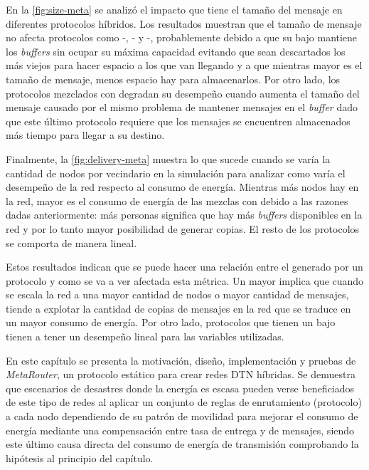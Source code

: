 En la \ref{fig:size-meta} se analizó el impacto que tiene el tamaño del
mensaje en diferentes protocolos híbridos. Los resultados muestran que el tamaño
de mensaje no afecta protocolos como \prophet-\syw, \maxprop-\syw{} y
\epidemic-\syw, probablemente debido a que su bajo \overhead{} mantiene los
\textit{buffers} sin ocupar su máxima capacidad evitando que sean descartados
los más viejos para hacer espacio a los que van llegando y a que mientras mayor
es el tamaño de mensaje, menos espacio hay para almacenarlos.  Por otro lado,
los protocolos mezclados con \syf{} degradan su desempeño cuando aumenta el
tamaño del mensaje causado por el mismo problema de mantener mensajes en el
\textit{buffer} dado que este último protocolo requiere que los mensajes se
encuentren almacenados más tiempo para llegar a su destino.

Finalmente, la \ref{fig:delivery-meta} muestra lo que sucede cuando se varía la
cantidad de nodos por vecindario en la simulación para analizar como varía el
desempeño de la red respecto al consumo de energía. Mientras más nodos hay en la
red, mayor es el consumo de energía de las mezclas con \syf{} debido a las
razones dadas anteriormente: más personas significa que hay más \textit{buffers}
disponibles en la red y por lo tanto mayor posibilidad de generar copias. El
resto de los protocolos se comporta de manera lineal.


Estos resultados indican que se puede hacer una relación entre el \overhead{}
generado por un protocolo y como se va a ver afectada esta métrica. Un mayor
\overhead{} implica que cuando se escala la red a una mayor cantidad de nodos o
mayor cantidad de mensajes, tiende a explotar la cantidad de copias de mensajes
en la red que se traduce en un mayor consumo de energía. Por otro lado,
protocolos que tienen un bajo \overhead{} tienen a tener un desempeño lineal para
las variables utilizadas.




En este capítulo se presenta la motivación, diseño, implementación y pruebas de
\textit{MetaRouter}, un protocolo estático para crear redes DTN híbridas. Se
demuestra que escenarios de desastres donde la energía es escasa pueden verse
beneficiados de este tipo de redes al aplicar un conjunto de reglas de
enrutamiento (protocolo) a cada nodo dependiendo de su patrón de movilidad para
mejorar el consumo de energía mediante una compensación entre tasa de entrega y
\overhead{} de mensajes, siendo este último causa directa del consumo de energía
de transmisión comprobando la hipótesis al principio del capítulo.


